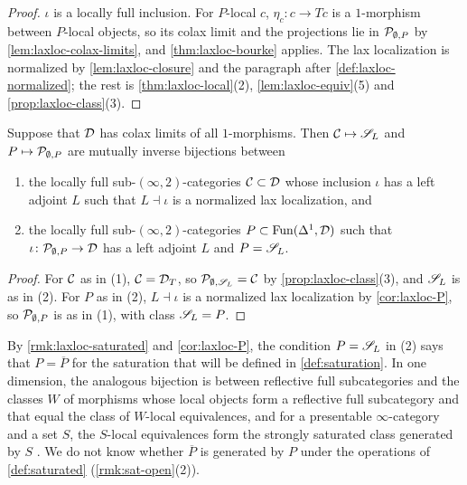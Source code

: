 \begin{proof}
%
$\iota$ is a locally full inclusion. For $P$-local $c$,
$\eta_{c}\colon c \to Tc$
is a $1$-morphism between $P$-local objects, so its colax limit and the
projections lie in $\mathcal{P}_{\emptyset,P}$ by \cref{lem:laxloc-colax-limits}, and
\cref{thm:laxloc-bourke} applies. The lax localization is normalized by
\cref{lem:laxloc-closure} and the paragraph after
\cref{def:laxloc-normalized}; the rest is \cref{thm:laxloc-local}(2),
\cref{lem:laxloc-equiv}(5) and \cref{prop:laxloc-class}(3).
\end{proof}

\begin{cor}
\label{cor:laxloc-classes}
%
Suppose that $\mathcal{D}$ has colax limits of all $1$-morphisms. Then
$\mathcal{C} \mapsto \mathscr{S}_{L}$
and
$P \mapsto \mathcal{P}_{\emptyset,P}$
are mutually inverse bijections between
\begin{enumerate}
\item the locally full sub-$(\infty,2)$-categories $\mathcal{C} \subset \mathcal{D}$ whose
inclusion $\iota$ has a left adjoint $L$ such that
$L \dashv \iota$
is a normalized lax localization, and
\item the locally full sub-$(\infty,2)$-categories
$P \subset \operatorname{Fun}(\Delta^{1},\mathcal{D})$
such that
$\iota\colon \mathcal{P}_{\emptyset,P} \to \mathcal{D}$
has a left adjoint $L$ and $P = \mathscr{S}_{L}$.
\end{enumerate}
\end{cor}

\begin{proof}
%
For $\mathcal{C}$ as in (1), $\mathcal{C} = \mathcal{D}_{T}$, so
$\mathcal{P}_{\emptyset,\mathscr{S}_{L}} = \mathcal{C}$
by \cref{prop:laxloc-class}(3), and $\mathscr{S}_{L}$ is as in (2). For $P$ as in (2),
$L \dashv \iota$
is a normalized lax localization by \cref{cor:laxloc-P}, so
$\mathcal{P}_{\emptyset,P}$
is as in (1), with class $\mathscr{S}_{L} = P$.
\end{proof}

%
By \cref{rmk:laxloc-saturated} and \cref{cor:laxloc-P}, the condition
$P = \mathscr{S}_{L}$
in (2) says that
$P = \overline{P}$
for the saturation that will be defined in \cref{def:saturation}. In one
dimension, the analogous bijection is between reflective full subcategories and
the classes $W$ of morphisms whose local objects form a reflective full
subcategory and that equal the class of $W$-local equivalences, and
for a presentable $\infty$-category and a set $S$, the $S$-local equivalences
form the strongly saturated class generated by $S$ \cite[5.5.4.15]{htt}. We do
not know whether $\overline{P}$
is generated by $P$ under the operations of \cref{def:saturated}
(\cref{rmk:sat-open}(2)).


